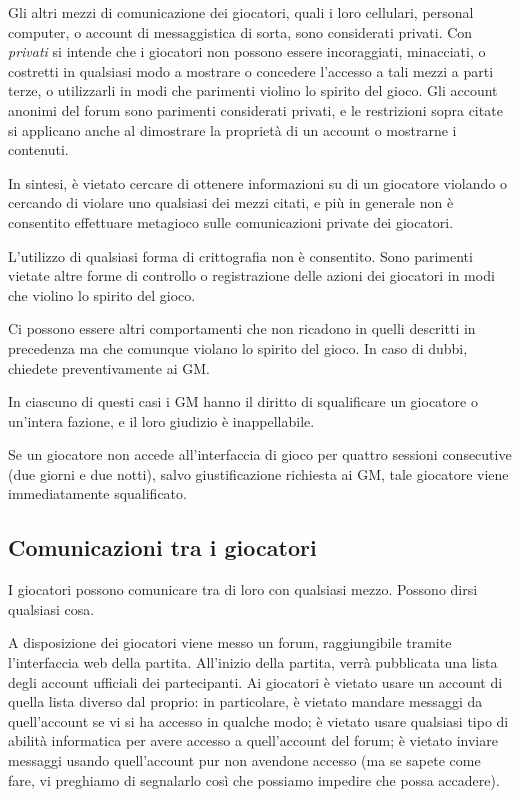 \documentclass[a4paper,10pt]{article}
\begin{document}
Gli altri mezzi di comunicazione dei giocatori, quali i loro cellulari, personal computer, o account di messaggistica di sorta, sono considerati privati.
Con \emph{privati} si intende che i giocatori non possono essere incoraggiati, minacciati, o costretti in qualsiasi modo a mostrare o concedere l'accesso a tali mezzi a parti terze, o utilizzarli in modi che parimenti violino lo spirito del gioco. Gli account anonimi del forum sono parimenti considerati privati, e le restrizioni sopra citate si applicano anche al dimostrare la proprietà di un account o mostrarne i contenuti.

In sintesi, è vietato cercare di ottenere informazioni su di un giocatore violando o cercando di violare uno qualsiasi dei mezzi citati, e più in generale non è consentito effettuare metagioco sulle comunicazioni private dei giocatori.

L'utilizzo di qualsiasi forma di crittografia non è consentito. Sono parimenti vietate altre forme di controllo o registrazione delle azioni dei giocatori in modi che violino lo spirito del gioco.

Ci possono essere altri comportamenti che non ricadono in quelli descritti in precedenza ma che comunque violano lo spirito del gioco. In caso di dubbi, chiedete preventivamente ai GM.

In ciascuno di questi casi i GM hanno il diritto di squalificare un giocatore o un'intera fazione, e il loro giudizio è inappellabile.

Se un giocatore non accede all'interfaccia di gioco per quattro sessioni consecutive (due giorni e due notti), salvo giustificazione richiesta ai GM, tale giocatore viene immediatamente squalificato. 

\subsection{Comunicazioni tra i giocatori}

I giocatori possono comunicare tra di loro con qualsiasi mezzo. Possono dirsi qualsiasi cosa.

A disposizione dei giocatori viene messo un forum, raggiungibile tramite l'interfaccia web della partita.  All'inizio della partita, verrà pubblicata una lista degli account ufficiali dei partecipanti. Ai giocatori è vietato usare un account di quella lista diverso dal proprio: in particolare, è vietato mandare messaggi da quell'account se vi si ha accesso in qualche modo; è vietato usare qualsiasi tipo di abilità informatica per avere accesso a quell'account del forum; è vietato inviare messaggi usando quell'account pur non avendone accesso (ma se sapete come fare, vi preghiamo di segnalarlo così che possiamo impedire che possa accadere).
\end{document}
